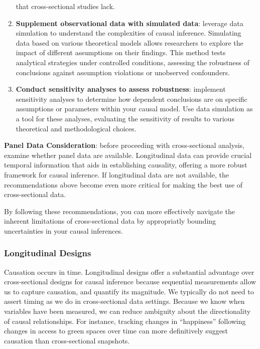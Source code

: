 \documentclass[
  singlecolumn]{article}
\begin{document}
\begin{enumerate}
  that cross-sectional studies lack.
\item
  \textbf{Supplement observational data with simulated data}: leverage
  data simulation to understand the complexities of causal inference.
  Simulating data based on various theoretical models allows researchers
  to explore the impact of different assumptions on their findings. This
  method tests analytical strategies under controlled conditions,
  assessing the robustness of conclusions against assumption violations
  or unobserved confounders.
\item
  \textbf{Conduct sensitivity analyses to assess robustness}: implement
  sensitivity analyses to determine how dependent conclusions are on
  specific assumptions or parameters within your causal model. Use data
  simulation as a tool for these analyses, evaluating the sensitivity of
  results to various theoretical and methodological choices.
\end{enumerate}

\textbf{Panel Data Consideration}: before proceeding with
cross-sectional analysis, examine whether panel data are available.
Longitudinal data can provide crucial temporal information that aids in
establishing causality, offering a more robust framework for causal
inference. If longitudinal data are not available, the recommendations
above become even more critical for making the best use of
cross-sectional data.

By following these recommendations, you can more effectively navigate
the inherent limitations of cross-sectional data by appropriatly
bounding uncertainties in your causal inferences.

\subsubsection{Longitudinal Designs}\label{longitudinal-designs}

Causation occurs in time. Longitudinal designs offer a substantial
advantage over cross-sectional designs for causal inference because
sequential measurements allow us to capture causation, and quantify its
magnitude. We typically do not need to assert timing as we do in
cross-sectional data settings. Because we know when variables have been
measured, we can reduce ambiguity about the directionality of causal
relationships. For instance, tracking changes in ``happiness'' following
changes in access to green spaces over time can more definitively
suggest causation than cross-sectional snapshots.
\end{document}
